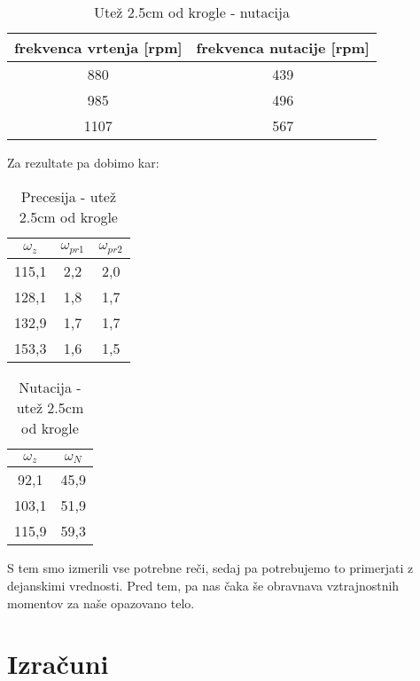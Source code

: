 \documentclass[11pt, a4paper]{article}
\theoremstyle{definition}
\theoremstyle{example}
\theoremstyle{izrek}
\begin{document}
\begin{table}[h]
	\centering
	\begin{tabular}{|c|c|}
		\hline
		frekvenca vrtenja [rpm] & frekvenca nutacije [rpm]\\
		\hline
		\hline
		880 &	439\\
		\hline
		985 &	496\\
		\hline
		1107 &	567\\
		\hline
		
		
	\end{tabular}
	\caption{Utež 2.5cm od krogle - nutacija}
\end{table}

Za rezultate pa dobimo kar: \\

\begin{table}[h]
	\centering
	\begin{tabular}{|c|c|c|}
		\hline
		\rule{0pt}{3ex}   
		$\omega_z$ & $\omega_{pr1}$\: & $\omega_{pr2}$\\
		\hline
		\hline
		115,1 &	2,2 &	2,0 \\
		\hline
		128,1 &	1,8 &	1,7 \\
		\hline
		132,9 &	1,7 &	1,7 \\
		\hline
		153,3 &	1,6 &	1,5 \\
		\hline
		
		
	\end{tabular}
	\caption{Precesija - utež 2.5cm od krogle}
\end{table}

\begin{table}[H]
	\centering
	\begin{tabular}{|c|c|}
		\hline
		\rule{0pt}{3ex}   
		$\omega_z$ & $\omega_{N}$ \\
		\hline
		\hline
		92,1 &	45,9 \\
		\hline
		103,1 &	51,9 \\
		\hline
		115,9 &	59,3 \\
		\hline
	\end{tabular}
	\caption{Nutacija - utež 2.5cm od krogle}
\end{table}
	
S tem smo izmerili vse potrebne reči, sedaj pa potrebujemo to primerjati z dejanskimi vrednosti.
Pred tem, pa nas čaka še obravnava vztrajnostnih momentov za naše opazovano telo.

\pagebreak
\section{Izračuni}
\end{document}
